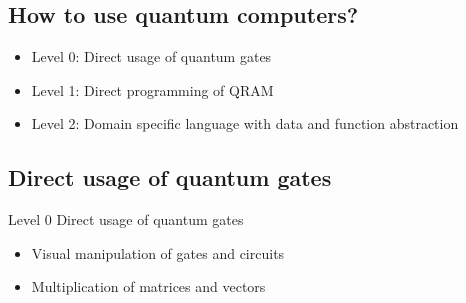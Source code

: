 \documentclass{beamer}
\begin{document}
\subsection{How to use quantum computers?}


\begin{frame}{\insertsection}{\insertsubsection}

  \begin{itemize}
    \item<-1> Level 0: Direct usage of quantum gates
    \item<2-> Level 1: Direct programming of QRAM 
    \item<3-> Level 2: Domain specific language with data and function 
    abstraction
  \end{itemize}
\end{frame}

\subsection{Direct usage of quantum gates}

\begin{frame}{\insertsection}{\insertsubsection}
\begin{block}{Level 0}
    Direct usage of quantum gates
\end{block}
\begin{itemize}
    \item Visual manipulation of gates and circuits
    \item Multiplication of matrices and vectors 
\end{itemize}
\end{frame}
\end{document}
